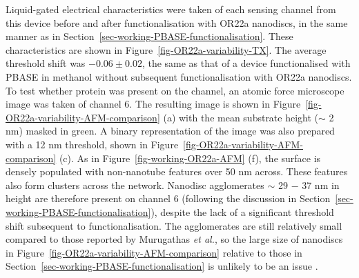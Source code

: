 \documentclass[
  a4paper,
]{scrbook}
\begin{document}
Liquid-gated electrical characteristics were taken of each sensing
channel from this device before and after functionalisation with OR22a
nanodiscs, in the same manner as in
Section~\ref{sec-working-PBASE-functionalisation}. These characteristics
are shown in Figure~\ref{fig-OR22a-variability-TX}. The average
threshold shift was \(-0.06 \pm 0.02\), the same as that of a device
functionalised with PBASE in methanol without subsequent
functionalisation with OR22a nanodiscs. To test whether protein was
present on the channel, an atomic force microscope image was taken of
channel 6. The resulting image is shown in
Figure~\ref{fig-OR22a-variability-AFM-comparison} (a) with the mean
substrate height (\(\sim\) 2 nm) masked in green. A binary
representation of the image was also prepared with a 12 nm threshold,
shown in Figure~\ref{fig-OR22a-variability-AFM-comparison} (c). As in
Figure~\ref{fig-working-OR22a-AFM} (f), the surface is densely populated
with non-nanotube features over 50 nm across. These features also form
clusters across the network. Nanodisc agglomerates \(\sim\) 29 \(-\) 37
nm in height are therefore present on channel 6 (following the
discussion in Section~\ref{sec-working-PBASE-functionalisation}),
despite the lack of a significant threshold shift subsequent to
functionalisation. The agglomerates are still relatively small compared
to those reported by Murugathas \emph{et al.}, so the large size of
nanodiscs in Figure~\ref{fig-OR22a-variability-AFM-comparison} relative
to those in Section~\ref{sec-working-PBASE-functionalisation} is
unlikely to be an issue \autocite{Murugathas2019a}.
\end{document}
